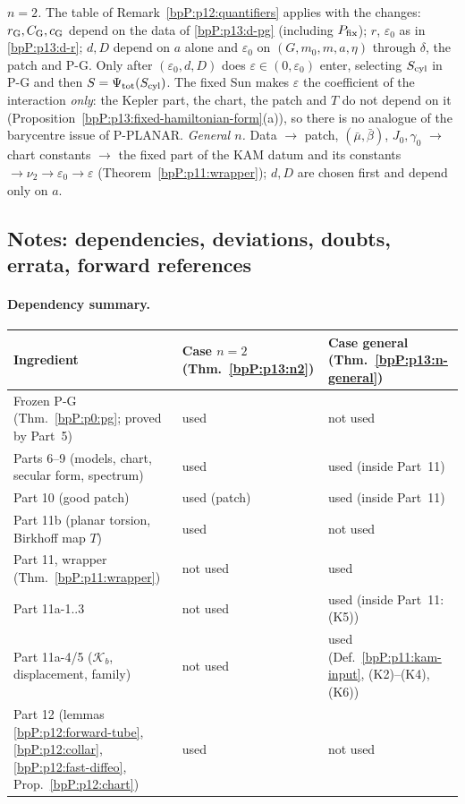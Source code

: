\begin{remark}\label{bpP:p13:quantifiers}
\emph{$n=2$.} The table of Remark~\ref{bpP:p12:quantifiers} applies with the changes: $r_{\rm G},C_{\rm G},c_{\rm G}$ depend on the data of \ref{bpP:p13:d-pg} (including $P_{\rm fix}$); $r$, $\varepsilon_0$ as in \ref{bpP:p13:d-r}; $d,D$ depend on $a$ alone and $\varepsilon_0$ on $(G,m_0,m,a,\eta)$ through $\delta$, the patch and P-G. Only after $(\varepsilon_0,d,D)$ does $\varepsilon\in(0,\varepsilon_0)$ enter, selecting $S_{\rm cyl}$ in P-G and then $S=\Psi_{\rm tot}(S_{\rm cyl})$. The fixed Sun makes $\varepsilon$ the coefficient of the interaction \emph{only}: the Kepler part, the chart, the patch and $T$ do not depend on it (Proposition~\ref{bpP:p13:fixed-hamiltonian-form}(a)), so there is no analogue of the barycentre issue of P-PLANAR.
\emph{General $n$.} Data $\to$ patch, $(\bar\mu,\bar\beta)$, $J_0,\gamma_0$ $\to$ chart constants $\to$ the fixed part of the KAM datum and its constants $\to\nu_2\to\varepsilon_0\to\varepsilon$ (Theorem~\ref{bpP:p11:wrapper}); $d,D$ are chosen first and depend only on $a$.
\end{remark}

\subsection{Notes: dependencies, deviations, doubts, errata, forward references}\label{bpP:p13:notes}

\paragraph{Dependency summary.}
\begin{center}\small
\begin{tabular}{@{}lll@{}}
\hline
Ingredient & Case $n=2$ (Thm.~\ref{bpP:p13:n2}) & Case general (Thm.~\ref{bpP:p13:n-general})\\
\hline
Frozen P-G (Thm.~\ref{bpP:p0:pg}; proved by Part~5) & used & not used\\
Parts 6--9 (models, chart, secular form, spectrum) & used & used (inside Part~11)\\
Part 10 (good patch) & used (patch) & used (inside Part~11)\\
Part 11b (planar torsion, Birkhoff map $T$) & used & not used\\
Part 11, wrapper (Thm.~\ref{bpP:p11:wrapper}) & not used & used\\
Part 11a-1..3 & not used & used (inside Part~11: (K5))\\
Part 11a-4/5 ($\mathcal K_b$, displacement, family) & not used & used (Def.~\ref{bpP:p11:kam-input}, (K2)--(K4), (K6))\\
Part 12 (lemmas \ref{bpP:p12:forward-tube}, \ref{bpP:p12:collar}, \ref{bpP:p12:fast-diffeo}, Prop.~\ref{bpP:p12:chart}) & used & not used\\
\hline
\end{tabular}
\end{center}

